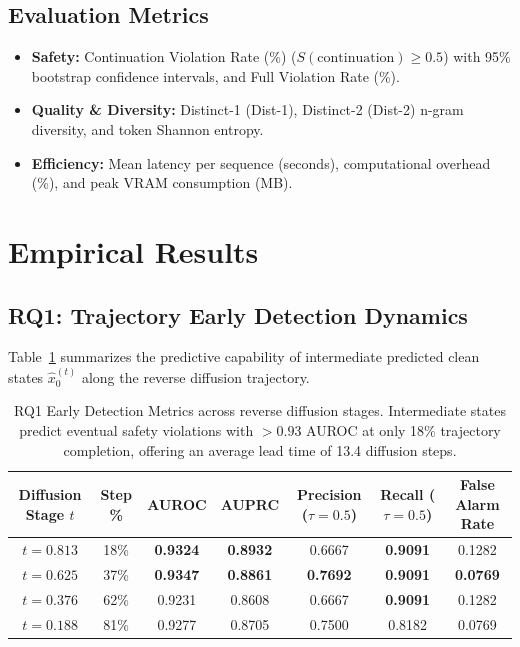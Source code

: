 \documentclass[conference]{IEEEtran}
\begin{document}
\subsection{Evaluation Metrics}
\begin{itemize}
    \item \textbf{Safety:} Continuation Violation Rate (\%) ($S(\text{continuation}) \ge 0.5$) with 95\% bootstrap confidence intervals, and Full Violation Rate (\%).
    \item \textbf{Quality \& Diversity:} Distinct-1 (Dist-1), Distinct-2 (Dist-2) n-gram diversity, and token Shannon entropy.
    \item \textbf{Efficiency:} Mean latency per sequence (seconds), computational overhead (\%), and peak VRAM consumption (MB).
\end{itemize}

\section{Empirical Results}

\subsection{RQ1: Trajectory Early Detection Dynamics}
Table~\ref{tab:rq1} summarizes the predictive capability of intermediate predicted clean states $\hat{x}_0^{(t)}$ along the reverse diffusion trajectory.

\begin{table}[t]
\centering
\small
\begin{tabular}{ccccccc}
\toprule
\textbf{Diffusion Stage $t$} & \textbf{Step \%} & \textbf{AUROC} & \textbf{AUPRC} & \textbf{Precision ($\tau=0.5$)} & \textbf{Recall ($\tau=0.5$)} & \textbf{False Alarm Rate} \\
\midrule
$t = 0.813$ & 18\% & \textbf{0.9324} & \textbf{0.8932} & 0.6667 & \textbf{0.9091} & 0.1282 \\
$t = 0.625$ & 37\% & \textbf{0.9347} & \textbf{0.8861} & \textbf{0.7692} & \textbf{0.9091} & \textbf{0.0769} \\
$t = 0.376$ & 62\% & 0.9231 & 0.8608 & 0.6667 & \textbf{0.9091} & 0.1282 \\
$t = 0.188$ & 81\% & 0.9277 & 0.8705 & 0.7500 & 0.8182 & 0.0769 \\
\bottomrule
\end{tabular}
\caption{RQ1 Early Detection Metrics across reverse diffusion stages. Intermediate states predict eventual safety violations with $>0.93$ AUROC at only 18\% trajectory completion, offering an average lead time of 13.4 diffusion steps.}
\label{tab:rq1}
\end{table}
\end{document}
